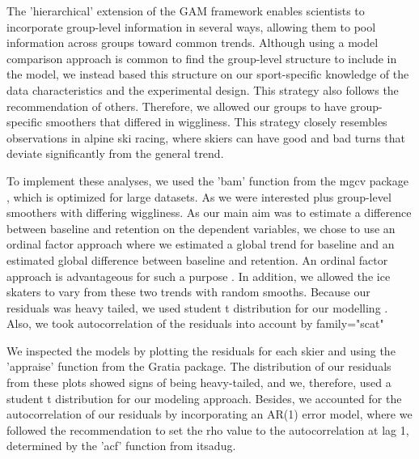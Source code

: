 \documentclass{article}
\begin{document}
The 'hierarchical' extension of the GAM framework enables scientists to incorporate group-level information in several ways, allowing them to pool information across groups toward common trends. Although using a model comparison approach is common to find the group-level structure to include in the model, we instead based this structure on our sport-specific knowledge of the data characteristics and the experimental design. This strategy also follows the recommendation of others. Therefore, we allowed our groups to have group-specific smoothers that differed in wiggliness. This strategy closely resembles observations in alpine ski racing, where skiers can have good and bad turns that deviate significantly from the general trend.   

To implement these analyses, we used the 'bam' function from the mgcv package \cite{mgcv}, which is optimized for large datasets. As we were interested plus group-level smoothers with differing wiggliness. As our main aim was to estimate a difference between baseline and retention on the dependent variables, we chose to use an ordinal factor approach where we estimated a global trend for baseline and an estimated global difference between baseline and retention. An ordinal factor approach is advantageous for such a purpose \cite{soskuthy_evaluating_2021}. In addition, we allowed the ice skaters to vary from these two trends with random smooths. Because our residuals was heavy tailed, we used student t distribution for our modelling \cite{soskuthy_evaluating_2021}. Also, we took autocorrelation of the residuals into account by family="scat"

We inspected the models by plotting the residuals for each skier and using the 'appraise' function from the Gratia package. The distribution of our residuals from these plots showed signs of being heavy-tailed, and we, therefore, used a student t distribution for our modeling approach. Besides, we accounted for the autocorrelation of our residuals by incorporating an AR(1) error model, where we followed the recommendation to set the rho value to the autocorrelation at lag 1, determined by the 'acf' function from itsadug.







\printbibliography %
\end{document}
